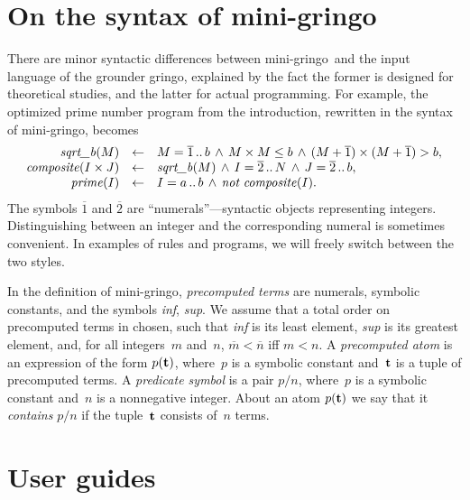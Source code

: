 \documentclass{article}
\def\ar{\leftarrow}
\def\ba{\begin{array}}
\def\ea{\end{array}}
\def\gringo{{\sc gringo}}
\def\num{\overline}
\begin{document}
\section{On the syntax of mini-\gringo}\label{sec:mg}

There are minor syntactic differences between
mini-\gringo\ and the input language of the grounder \gringo,
explained by the fact the former is designed for theoretical studies, and the
latter for actual programming.
For example, the optimized prime number program from the introduction,
rewritten in the syntax of mini-\gringo, becomes
$$\ba {rcl}
\emph{sqrt\_b\/}(M) &\ar& M = \num  1\,..\,b \,\land\, M\times M \leq b
          \,\land\, (M+\num 1)\times(M+\num 1) > b,\\
          \emph{composite\/}(I\times J) &\ar& \emph{sqrt\_b\/}(M) \,\land\,
                 I = \num 2\,..\,N \,\land\, J = \num 2\,..\,b,\\
                 \emph{prime\/}(I) &\ar& I = a\,..\,b
                 \,\land\, \emph{not}\ \emph{composite\/}(I).
\ea
$$
The symbols $\num 1$ and $\num 2$ are ``numerals''---syntactic objects
representing integers. Distinguishing between an integer and the corresponding
numeral is sometimes convenient.  In examples of rules and programs, we will
freely switch between the two styles.

In the definition of mini-\gringo,
\emph{precomputed terms} are numerals,
  symbolic constants, and the symbols \emph{inf}, \emph{sup}.
  We assume that a total order on precomputed terms in chosen, such that
  \emph{inf} is its least element, \emph{sup} is its greatest element, and,
 for all integers~$m$ and~$n$,   $\num m < \num n$ iff $m<n$.
A  \emph{precomputed atom} is an expression of the form $p({\bf t})$, where~$p$
  is a symbolic constant and~$\bf t$ is a tuple of precomputed terms.
  A \emph{predicate symbol} is a pair $p/n$, where~$p$ is a symbolic
  constant and~$n$ is a nonnegative integer.  About an atom $p({\bf t})$ we
  say that it \emph{contains} $p/n$ if the tuple~$\bf t$ consists of~$n$
  terms.

\section{User guides}
\end{document}
